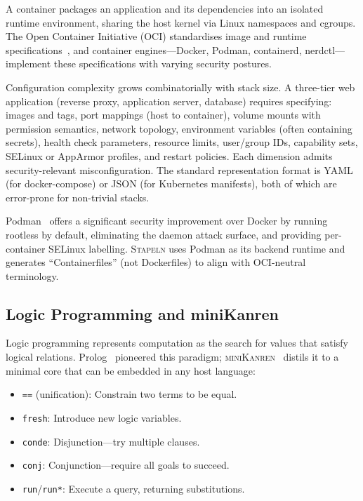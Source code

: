 \documentclass[11pt,twocolumn]{article}
\newcommand{\stapeln}{\textsc{Stapeln}\xspace}
\newcommand{\minikanren}{\textsc{miniKanren}\xspace}
\begin{document}
A container packages an application and its dependencies into an
isolated runtime environment, sharing the host kernel via Linux
namespaces and cgroups. The Open Container Initiative (OCI)
standardises image and runtime specifications~\cite{oci2024}, and
container engines---Docker, Podman, containerd, nerdctl---implement
these specifications with varying security postures.

Configuration complexity grows combinatorially with stack size. A
three-tier web application (reverse proxy, application server,
database) requires specifying: images and tags, port mappings (host to
container), volume mounts with permission semantics, network topology,
environment variables (often containing secrets), health check
parameters, resource limits, user/group IDs, capability sets, SELinux
or AppArmor profiles, and restart policies. Each dimension admits
security-relevant misconfiguration. The standard representation format
is YAML (for docker-compose) or JSON (for Kubernetes manifests), both
of which are error-prone for non-trivial stacks.

Podman~\cite{podman2024} offers a significant security improvement
over Docker by running rootless by default, eliminating the daemon
attack surface, and providing per-container SELinux labelling.
\stapeln uses Podman as its backend runtime and generates
``Containerfiles'' (not Dockerfiles) to align with OCI-neutral
terminology.

\subsection{Logic Programming and miniKanren}
\label{sec:bg-kanren}

Logic programming represents computation as the search for values that
satisfy logical relations. Prolog~\cite{colmerauer1993} pioneered this
paradigm; \minikanren~\cite{byrd2010,friedman2005} distils it to a
minimal core that can be embedded in any host language:

\begin{itemize}[leftmargin=*]
\item \texttt{==} (unification): Constrain two terms to be equal.
\item \texttt{fresh}: Introduce new logic variables.
\item \texttt{conde}: Disjunction---try multiple clauses.
\item \texttt{conj}: Conjunction---require all goals to succeed.
\item \texttt{run}/\texttt{run*}: Execute a query, returning
      substitutions.
\end{itemize}
\end{document}
